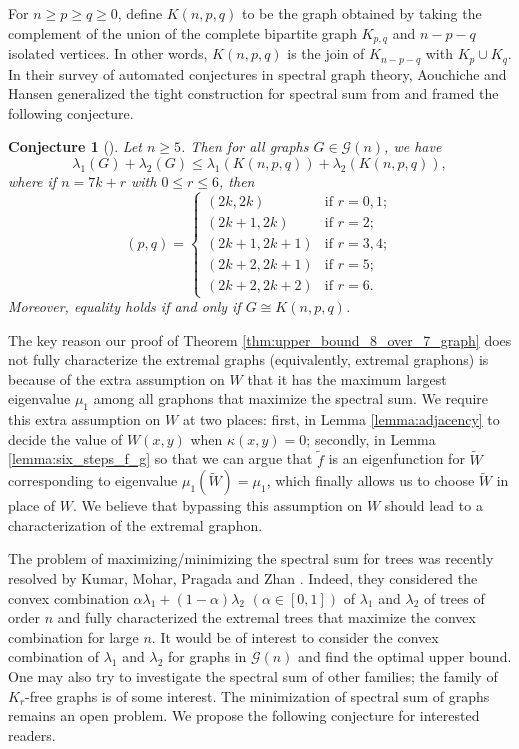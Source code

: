 \documentclass[11pt]{article}
\theoremstyle{plain}
\newtheorem{conjecture}[theorem]{Conjecture}
\theoremstyle{definition}
\numberwithin{equation}{section}
\begin{document}
For $n\geq p\geq q\geq 0$, define $K(n,p,q)$ to be the graph obtained by taking the complement of 
the union of the complete bipartite graph $K_{p,q}$ and $n-p-q$ isolated vertices. In other words, 
$K(n,p,q)$ is the join of $K_{n-p-q}$ with $K_p \cup K_q$. In their survey of automated conjectures 
in spectral graph theory, Aouchiche and Hansen \cite{Aouchiche_Hansen_2010} generalized the 
tight construction for spectral sum from \cite{Ebrahimi_Mohar_Nikiforov_Ahmady_2008} and framed the following conjecture. 

\begin{conjecture}[\cite{Aouchiche_Hansen_2010,Ebrahimi_Mohar_Nikiforov_Ahmady_2008}]\label{conj:spectral_sum_extremal_graphs}
Let $n\geq 5$. Then for all graphs $G\in \mathcal{G}(n)$, we have
\[
\lambda_1(G)+\lambda_2(G)\leq \lambda_1(K(n,p,q))+\lambda_2(K(n,p,q)),
\]
where if $n=7k+r$ with $0\leq r\le 6$, then 
\[
(p,q)= 
\begin{cases}
(2k,2k) & \text{if }r=0,1;\\
(2k+1,2k) & \text{if }r=2;\\
(2k+1,2k+1) & \text{if }r=3, 4;\\
(2k+2,2k+1) &\text{if }r=5;\\
(2k+2,2k+2) &\text{if }r=6.
\end{cases} 
\] 
Moreover, equality holds if and only if $G\cong K(n,p,q)$. 
\end{conjecture}

The key reason our proof of Theorem \ref{thm:upper_bound_8_over_7_graph} does not fully characterize 
the extremal graphs (equivalently, extremal graphons) is because of the extra assumption on $W$ that 
it has the maximum largest eigenvalue $\mu_1$ among all graphons that maximize the spectral sum. 
We require this extra assumption on $W$ at two places: first, in Lemma \ref{lemma:adjacency} to 
decide the value of $W(x,y)$ when $\kappa(x,y) = 0$; secondly, in Lemma \ref{lemma:six_steps_f_g} 
so that we can argue that $\tilde{f}$ is an eigenfunction for $\widetilde{W}$ corresponding to 
eigenvalue $\mu_1(\widetilde{W}) = \mu_1$, which finally allows us to choose $\widetilde{W}$ 
in place of $W$. We believe that bypassing this assumption on $W$ should lead to a characterization of the extremal graphon.

The problem of maximizing/minimizing the spectral sum for trees was recently resolved by 
Kumar, Mohar, Pragada and Zhan \cite{Kumar_Mohar_Pragada_Zhan_2026}. Indeed, they considered 
the convex combination $\alpha \lambda_1 + (1-\alpha)\lambda_2$ $(\alpha \in [0,1])$ of $\lambda_1$ 
and $\lambda_2$ of trees of order $n$ and fully characterized the extremal trees that maximize the convex combination for large $n$. 
It would be of interest to consider the convex combination of $\lambda_1$ and $\lambda_2$ for 
graphs in $\mathcal{G}(n)$ and find the optimal upper bound. One may also try to investigate the 
spectral sum of other families; the family of $K_r$-free graphs is of some interest. 
The minimization of spectral sum of graphs remains an open problem. We propose the 
following conjecture for interested readers.
\end{document}
